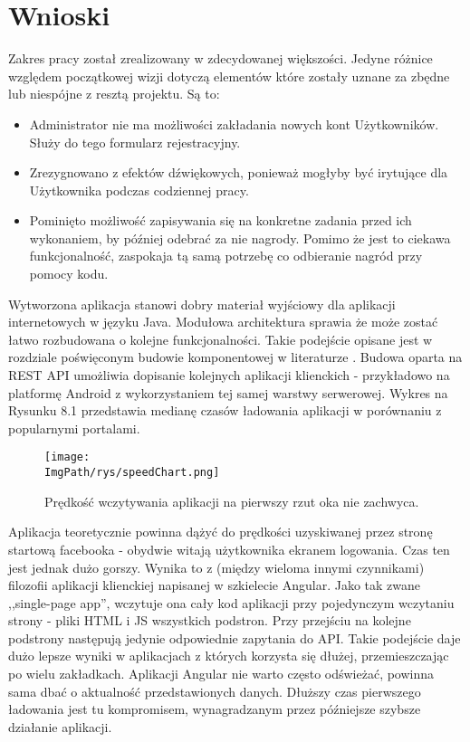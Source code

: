 \documentclass[a4paper,12pt,twoside,openany]{report}
\newcommand{\ImgPath}{.}
\begin{document}
\chapter{Wnioski}
\label{Ending}
Zakres pracy został zrealizowany w zdecydowanej większości. Jedyne różnice względem początkowej wizji dotyczą elementów które zostały uznane za zbędne lub niespójne z resztą projektu. Są to:
\begin{itemize}
 \item Administrator nie ma możliwości zakładania nowych kont Użytkowników. Służy do tego formularz rejestracyjny. 
 \item Zrezygnowano z efektów dźwiękowych, ponieważ mogłyby być irytujące dla Użytkownika podczas codziennej pracy.
 \item Pominięto możliwość zapisywania się na konkretne zadania przed ich wykonaniem, by później odebrać za nie nagrody. Pomimo że jest to ciekawa funkcjonalność, zaspokaja tą samą potrzebę co odbieranie nagród przy pomocy kodu.
 \end{itemize}
 Wytworzona aplikacja stanowi dobry materiał wyjściowy dla aplikacji internetowych w języku Java. Modułowa architektura sprawia że może zostać łatwo rozbudowana o kolejne funkcjonalności. Takie podejście opisane jest w rozdziale poświęconym budowie komponentowej w literaturze \cite{Inzynieria1}. Budowa oparta na REST API umożliwia dopisanie kolejnych aplikacji klienckich - przykładowo na platformę Android z wykorzystaniem tej samej warstwy serwerowej.
Wykres na Rysunku 8.1 przedstawia medianę czasów ładowania aplikacji w porównaniu z popularnymi portalami. 
				\begin{figure}[!htbp]
					\begin{center}
						\centering
						\texttt{[image: \\ImgPath/rys/speedChart.png]}
					\end{center}
					\caption{Prędkość wczytywania aplikacji na pierwszy rzut oka nie zachwyca.}
					\label{UMLTS}
				\end{figure}
Aplikacja teoretycznie powinna dążyć do prędkości uzyskiwanej przez stronę startową facebooka - obydwie witają użytkownika ekranem logowania. Czas ten jest jednak dużo gorszy. Wynika to z (między wieloma innymi czynnikami) filozofii aplikacji klienckiej napisanej w szkielecie Angular. Jako tak zwane ,,single-page app'', wczytuje ona cały kod aplikacji przy pojedynczym wczytaniu strony  - pliki HTML i JS wszystkich podstron. Przy przejściu na kolejne podstrony następują jedynie odpowiednie zapytania do API. Takie podejście daje dużo lepsze wyniki w aplikacjach z których korzysta się dłużej, przemieszczając po wielu zakładkach. Aplikacji Angular nie warto często odświeżać, powinna sama dbać o aktualność przedstawionych danych. Dłuższy czas pierwszego ładowania jest tu kompromisem, wynagradzanym przez późniejsze szybsze działanie aplikacji.\\
\end{document}
